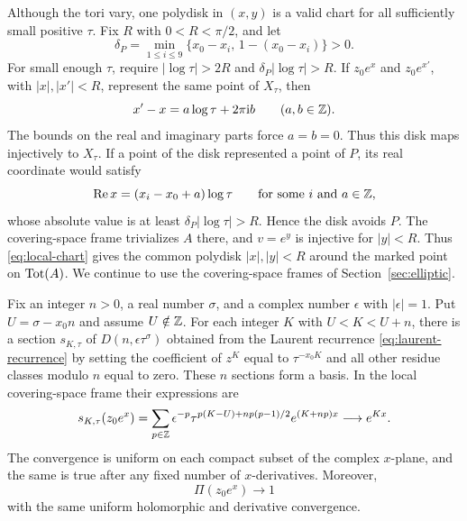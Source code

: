 Although the tori vary, one polydisk in $(x,y)$ is a valid chart for
all sufficiently small positive $\tau$.
Fix $R$ with $0<R<\pi/2$, and let
\[
 \delta_P=\min_{1\leq i\leq9}
           \{x_0-x_i,\,1-(x_0-x_i)\}>0.
\]
For small enough $\tau$, require
$|\log\tau|>2R$ and $\delta_P|\log\tau|>R$.
If $z_0e^x$ and $z_0e^{x'}$, with $|x|,|x'|<R$, represent the
same point of $X_\tau$, then
\[
 x'-x=a\log\tau+2\pi\mathrm{i}b\qquad(a,b\in\mathbb Z).
\]
The bounds on the real and imaginary parts force $a=b=0$.
Thus this disk maps injectively to $X_\tau$. If a point of the
disk represented a point of $P$, its real coordinate would satisfy
\[
 \operatorname{Re}x=(x_i-x_0+a)\log\tau
 \qquad\text{for some }i\text{ and }a\in\mathbb Z,
\]
whose absolute value is at least $\delta_P|\log\tau|>R$.
Hence the disk avoids $P$. The covering-space frame trivializes
$A$ there, and $v=e^y$ is injective for $|y|<R$.
Thus \eqref{eq:local-chart} gives the common polydisk $|x|,|y|<R$
around the marked point on $\operatorname{Tot}(A)$. We continue to use the
covering-space frames of Section~\ref{sec:elliptic}.

\begin{lemma}
\label{lem:theta-limit}
Fix an integer $n>0$, a real number $\sigma$, and a complex number
$\epsilon$ with $|\epsilon|=1$. Put $U=\sigma-x_0n$ and assume
$U\notin\mathbb Z$. For each integer $K$ with $U<K<U+n$, there is a
section $s_{K,\tau}$ of $D(n,\epsilon\tau^\sigma)$ obtained from
the Laurent recurrence \eqref{eq:laurent-recurrence} by setting
the coefficient of $z^K$ equal to $\tau^{-x_0K}$ and all other
residue classes modulo $n$ equal to zero. These $n$ sections form
a basis. In the local covering-space frame their expressions are
\begin{equation}
 s_{K,\tau}(z_0e^x)
  =\sum_{p\in\mathbb Z}\epsilon^{-p}
     \tau^{p(K-U)+np(p-1)/2}e^{(K+np)x}
  \longrightarrow e^{Kx}.
 \label{eq:normalized-theta}
\end{equation}
The convergence is uniform on each compact subset of the complex
$x$-plane, and the same is true after any fixed number of
$x$-derivatives. Moreover,
\[
 \Pi(z_0e^x)\longrightarrow1
\]
with the same uniform holomorphic and derivative convergence.
\end{lemma}

